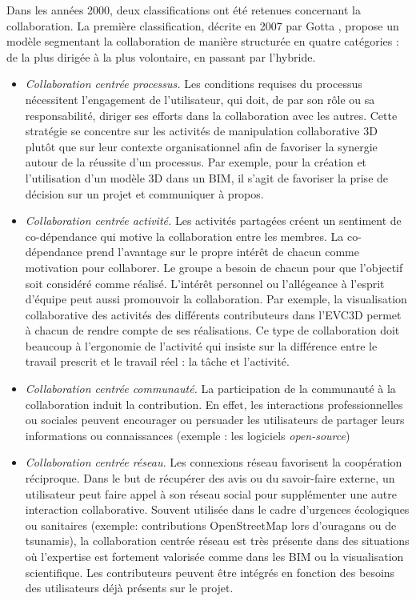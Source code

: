 Dans les années 2000, deux classifications ont été retenues concernant la 
collaboration.
La première classification, décrite en 2007 par Gotta \cite{Gotta2007}, propose 
un modèle segmentant la collaboration de manière structurée en quatre catégories 
: de la plus dirigée à la plus volontaire, en passant par l'hybride.
\begin{itemize}
	\item \textit{Collaboration centrée processus.} Les conditions requises du 
	processus 
	nécessitent l'engagement de l'utilisateur, qui doit, de par son rôle ou sa 
	responsabilité, diriger ses efforts dans la collaboration avec les autres. Cette 
	stratégie se concentre sur les activités de manipulation collaborative 3D plutôt 
	que sur leur contexte organisationnel afin de favoriser la synergie autour de la 
	réussite d'un processus. Par exemple, pour la création et l'utilisation d'un 
	modèle 	3D dans un \gls{BIM}, il s'agit de favoriser la prise de décision sur un 
	projet et communiquer à propos.
	
	\item \textit{Collaboration centrée activité.}
	Les activités partagées créent un sentiment de co-dé\-pendance qui motive la 
	collaboration entre les membres. La co-dépendance prend l'avantage sur le 
	propre intérêt de chacun comme motivation pour collaborer. Le groupe a besoin 
	de chacun pour que l'objectif soit considéré comme réalisé. L'intérêt personnel 
	ou l'allégeance à l'esprit d'équipe peut aussi promouvoir la collaboration. Par 
	exemple, la visualisation collaborative des activités des différents contributeurs 
	dans l'\gls{EVC3D} permet à chacun de rendre compte de ses réalisations. Ce 
	type de collaboration doit beaucoup à l'ergonomie de l'activité qui insiste sur la 
	différence entre le travail prescrit et le travail réel : la tâche et l'activité.
	
	\item \textit{Collaboration centrée communauté.}
	La participation de la communauté à la collaboration induit la contribution. En 
	effet, les interactions professionnelles ou sociales peuvent encourager ou 
	persuader les utilisateurs de partager leurs informations ou connaissances 
	(exemple : les logiciels \textit{open-source})
	
	\item \textit{Collaboration centrée réseau.}
	Les connexions réseau favorisent la coopération réciproque. Dans le but de 
	récupérer des avis ou du savoir-faire externe, un utilisateur peut faire appel à 
	son réseau social pour supplémenter une autre interaction collaborative. 
	Souvent utilisée dans le cadre d'urgences écologiques ou sanitaires (exemple: 
	contributions OpenStreetMap lors d'ouragans ou de tsunamis), la collaboration 
	centrée réseau est très présente dans des situations où l'expertise est fortement 
	valorisée comme dans les \gls{BIM} ou la visualisation scientifique. Les 
	contributeurs peuvent être intégrés en fonction des besoins des utilisateurs déjà 
	présents sur le projet.
\end{itemize}
